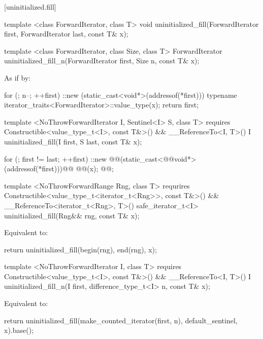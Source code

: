 [uninitialized.fill]{}
{\color{remclr}
\begin{codeblock}
template <class ForwardIterator, class T>
  void uninitialized_fill(ForwardIterator first, ForwardIterator last,
                          const T& x);
\end{codeblock}

\begin{codeblock}
template <class ForwardIterator, class Size, class T>
  ForwardIterator uninitialized_fill_n(ForwardIterator first, Size n, const T& x);
\end{codeblock}

\setcounter{Paras}{1}
\pnum
\effects As if by:
\begin{codeblock}
        for (; n--; ++first)
          ::new (static_cast<void*>(addressof(*first)))
            typename iterator_traits<ForwardIterator>::value_type(x);
        return first;
\end{codeblock}
} %

{\color{addclr}
\begin{codeblock}
template <NoThrowForwardIterator I, Sentinel<I> S, class T>
  requires Constructible<value_type_t<I>, const T&>() &&
           __ReferenceTo<I, T>()
  I uninitialized_fill(I first, S last, const T& x);
\end{codeblock}
} %

\setcounter{Paras}{0}
\pnum
\effects {}
\begin{codeblock}
        for (; first != last; ++first)
          ::new @@(static_cast<@@void*>(addressof(*first)))@\added{)}@
            @@(x);
        @@;
\end{codeblock}

{\color{addclr}
\begin{codeblock}
template <NoThrowForwardRange Rng, class T>
  requrires Constructible<value_type_t<iterator_t<Rng>>, const T&>() &&
            __ReferenceTo<iterator_t<Rng>, T>()
  safe_iterator_t<I>
  uninitialized_fill(Rng&& rng, const T& x);
\end{codeblock}

\setcounter{Paras}{0}
\pnum
\effects Equivalent to:
\begin{codeblock}
        return uninitialized_fill(begin(rng), end(rng), x);
\end{codeblock}

\begin{codeblock}
template <NoThrowForwardIterator I, class T>
  requires Constructible<value_type_t<I>, const T&>() &&
           __ReferenceTo<I, T>()
  I uninitialized_fill_n(I first, difference_type_t<I> n, const T& x);
\end{codeblock}

\pnum
\effects Equivalent to:
\begin{codeblock}
        return uninitialized_fill(make_counted_iterator(first, n),
                                  default_sentinel{}, x).base();
\end{codeblock}
} %

